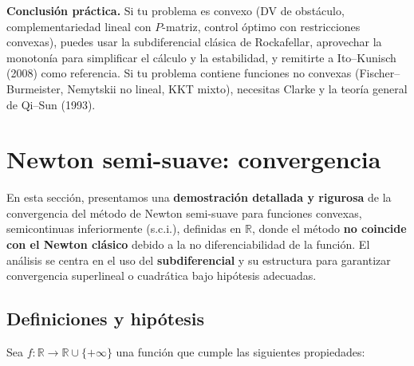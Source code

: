 \documentclass[12pt]{book}
\theoremstyle{definition}
\theoremstyle{plain}
\theoremstyle{remark}
\begin{document}
\bigskip

\textbf{Conclusión práctica.}  Si tu problema es convexo (DV de
obstáculo, complementariedad lineal con $P$-matriz, control óptimo
con restricciones convexas), puedes usar la subdiferencial clásica
de Rockafellar, aprovechar la monotonía para simplificar el cálculo
y la estabilidad, y remitirte a Ito--Kunisch (2008) como referencia.
Si tu problema contiene funciones no convexas (Fischer--Burmeister,
Nemytskii no lineal, KKT mixto), necesitas Clarke y la teoría
general de Qi--Sun (1993).

\chapter{Newton semi-suave: convergencia}


En esta sección, presentamos una \textbf{demostración detallada y rigurosa} de la convergencia del método de Newton semi-suave para funciones convexas, semicontinuas inferiormente (s.c.i.), definidas en \( \mathbb{R} \), donde el método \textbf{no coincide con el Newton clásico} debido a la no diferenciabilidad de la función. El análisis se centra en el uso del \textbf{subdiferencial} y su estructura para garantizar convergencia superlineal o cuadrática bajo hipótesis adecuadas.

\section*{Definiciones y hipótesis}

Sea \( f: \mathbb{R} \to \mathbb{R} \cup \{+\infty\} \) una función que cumple las siguientes propiedades:
\end{document}
